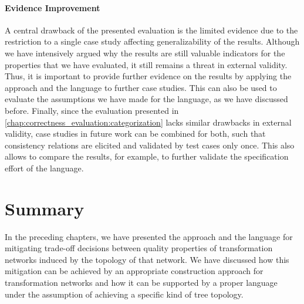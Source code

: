 

\paragraph{Evidence Improvement}
A central drawback of the presented evaluation is the limited evidence due to the restriction to a single case study affecting generalizability of the results.
Although we have intensively argued why the results are still valuable indicators for the properties that we have evaluated, it still remains a threat in external validity.
Thus, it is important to provide further evidence on the results by applying the approach and the language to further case studies.
This can also be used to evaluate the assumptions we have made for the language, as we have discussed before.
Finally, since the evaluation presented in \autoref{chap:correctness_evaluation:categorization} lacks similar drawbacks in external validity, case studies in future work can be combined for both, such that consistency relations are elicited and validated by test cases only once.
This also allows to compare the results, for example, to further validate the specification effort of the \commonalities language.


\section{Summary}

In the preceding chapters, we have presented the \commonalities approach and the \commonalities language for mitigating trade-off decisions between quality properties of transformation networks induced by the topology of that network.
We have discussed how this mitigation can be achieved by an appropriate construction approach for transformation networks and how it can be supported by a proper language under the assumption of achieving a specific kind of tree topology.

